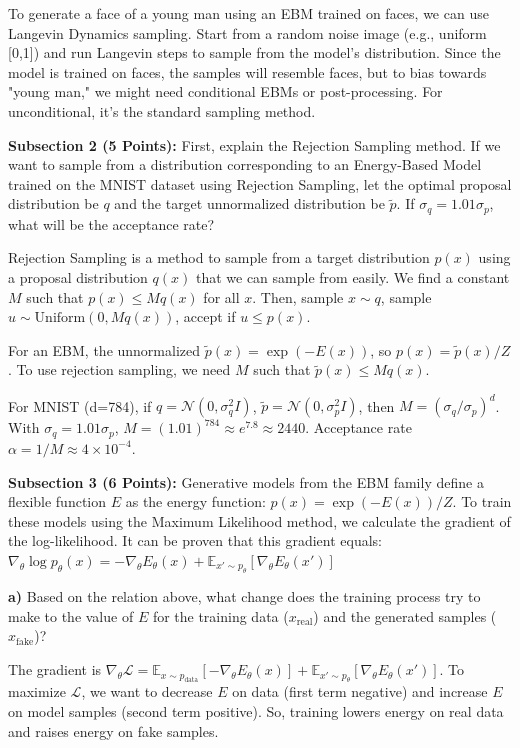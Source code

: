 \documentclass[a4paper,12pt]{article}
\begin{document}
To generate a face of a young man using an EBM trained on faces, we can use Langevin Dynamics sampling. Start from a random noise image (e.g., uniform [0,1]) and run Langevin steps to sample from the model's distribution. Since the model is trained on faces, the samples will resemble faces, but to bias towards "young man," we might need conditional EBMs or post-processing. For unconditional, it's the standard sampling method.

\textbf{Subsection 2 (5 Points):} First, explain the Rejection Sampling method. If we want to sample from a distribution corresponding to an Energy-Based Model trained on the MNIST dataset using Rejection Sampling, let the optimal proposal distribution be $q$ and the target unnormalized distribution be $\tilde{p}$. If $\sigma_q = 1.01 \sigma_p$, what will be the acceptance rate?

Rejection Sampling is a method to sample from a target distribution $p(x)$ using a proposal distribution $q(x)$ that we can sample from easily. We find a constant $M$ such that $p(x) \leq M q(x)$ for all $x$. Then, sample $x \sim q$, sample $u \sim \text{Uniform}(0, M q(x))$, accept if $u \leq p(x)$.

For an EBM, the unnormalized $\tilde{p}(x) = \exp(-E(x))$, so $p(x) = \tilde{p}(x)/Z$. To use rejection sampling, we need $M$ such that $\tilde{p}(x) \leq M q(x)$.

For MNIST (d=784), if $q = \mathcal{N}(0, \sigma_q^2 I)$, $\tilde{p} = \mathcal{N}(0, \sigma_p^2 I)$, then $M = (\sigma_q / \sigma_p)^d$. With $\sigma_q = 1.01 \sigma_p$, $M = (1.01)^{784} \approx e^{7.8} \approx 2440$. Acceptance rate $\alpha = 1/M \approx 4 \times 10^{-4}$.

\textbf{Subsection 3 (6 Points):} Generative models from the EBM family define a flexible function $E$ as the energy function: $p(x) = \exp(-E(x))/Z$. To train these models using the Maximum Likelihood method, we calculate the gradient of the log-likelihood. It can be proven that this gradient equals: $\nabla_\theta \log p_\theta(x) = -\nabla_\theta E_\theta(x) + \mathbb{E}_{x' \sim p_\theta} [\nabla_\theta E_\theta(x')]$

\textbf{a)} Based on the relation above, what change does the training process try to make to the value of $E$ for the training data ($x_{\text{real}}$) and the generated samples ($x_{\text{fake}}$)?

The gradient is $\nabla_\theta \mathcal{L} = \mathbb{E}_{x \sim p_{\text{data}}} [-\nabla_\theta E_\theta(x)] + \mathbb{E}_{x' \sim p_\theta} [\nabla_\theta E_\theta(x')]$. To maximize $\mathcal{L}$, we want to decrease $E$ on data (first term negative) and increase $E$ on model samples (second term positive). So, training lowers energy on real data and raises energy on fake samples.
\end{document}
